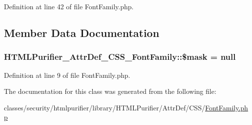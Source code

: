 Definition at line 42 of file Font\+Family.\+php.



\subsection{Member Data Documentation}
\hypertarget{classHTMLPurifier__AttrDef__CSS__FontFamily_ad4bc4fe0cf0e0873eab19f9a94163c4c}{
\subsubsection[{\$mask}]{\setlength{\rightskip}{0pt plus 5cm}H\+T\+M\+L\+Purifier\+\_\+\+Attr\+Def\+\_\+\+C\+S\+S\+\_\+\+Font\+Family\+::\$mask = null\hspace{0.3cm}{\ttfamily [protected]}}}\label{classHTMLPurifier__AttrDef__CSS__FontFamily_ad4bc4fe0cf0e0873eab19f9a94163c4c}


Definition at line 9 of file Font\+Family.\+php.



The documentation for this class was generated from the following file\+:\begin{DoxyCompactItemize}
\item 
classes/security/htmlpurifier/library/\+H\+T\+M\+L\+Purifier/\+Attr\+Def/\+C\+S\+S/\hyperlink{FontFamily_8php}{Font\+Family.\+php}\end{DoxyCompactItemize}
